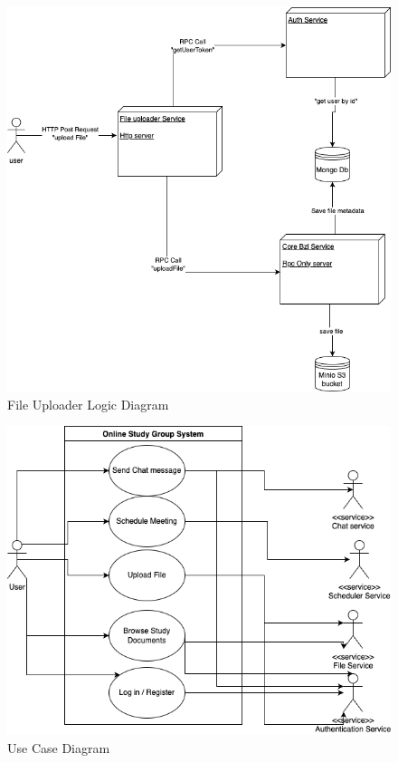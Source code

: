 \begin{figure}[!ht]
    \centering
    \includegraphics[width=1\linewidth]{file uplaod.drawio.png}
    \caption{File Uploader Logic Diagram}
    \label{fig:uploaderLogic}
\end{figure}

\begin{figure}[!ht]
    \centering
    \includegraphics[width=1\linewidth]{Use Case Licenta.drawio.png}
    \caption{Use Case Diagram}
    \label{fig:useCase}
\end{figure}

